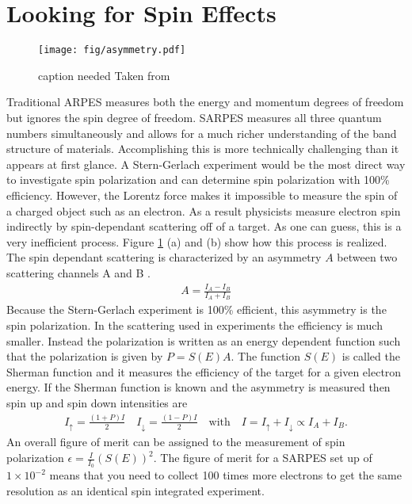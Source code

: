 \documentclass[12pt]{article}
\begin{document}
\section{Looking for Spin Effects}
\begin{figure}[h]
  \centering
  \texttt{[image: fig/asymmetry.pdf]}
  \caption[should I put this here?]
  {caption needed Taken from \cite{Okuda-Kimura}}
  \label{fig:asymmetry}
\end{figure}
Traditional ARPES measures both the energy and momentum degrees of freedom but ignores the spin degree of freedom.
SARPES measures all three quantum numbers simultaneously and allows for a much richer understanding of the band structure of materials.
Accomplishing this is more technically challenging than it appears at first glance.
A Stern-Gerlach experiment would be the most direct way to investigate spin polarization and can determine spin polarization with 100\% efficiency.
However, the Lorentz force makes it impossible to measure the spin of a charged object such as an electron.
As a result physicists measure electron spin indirectly by spin-dependant scattering off of a target.
As one can guess, this is a very inefficient process.
Figure \ref{fig:asymmetry} (a) and (b) show how this process is realized.
The spin dependant scattering is characterized by an asymmetry $A$ between two scattering channels A and B \cite{Okuda-Kimura}.
\begin{align}
  A=\frac{I_A-I_B}{I_A+I_B}
\end{align}
Because the Stern-Gerlach experiment is 100\% efficient, this asymmetry is the spin polarization.
In the scattering used in experiments the efficiency is much smaller.
Instead the polarization is written as an energy dependent function such that the polarization is given by $P=S(E)A$.
The function $S(E)$ is called the Sherman function and it measures the efficiency of the target for a given electron energy.
If the Sherman function is known and the asymmetry is measured then spin up and spin down intensities are
\begin{align}
  I_{\uparrow}=\frac{(1+P)I}{2}\quad I_{\downarrow}=\frac{(1-P)I}{2}\quad \text{with}\quad I=I_{\uparrow}+I_{\downarrow}\propto I_A+I_B\text{.}
\end{align}
An overall figure of merit can be assigned to the measurement of spin polarization $\epsilon=\frac{I}{I_0}(S(E))^2$.
The figure of merit for a SARPES set up of $1\times10^{-2}$ means that you need to collect 100 times more electrons to get the same resolution as an identical spin integrated experiment.
\end{document}
